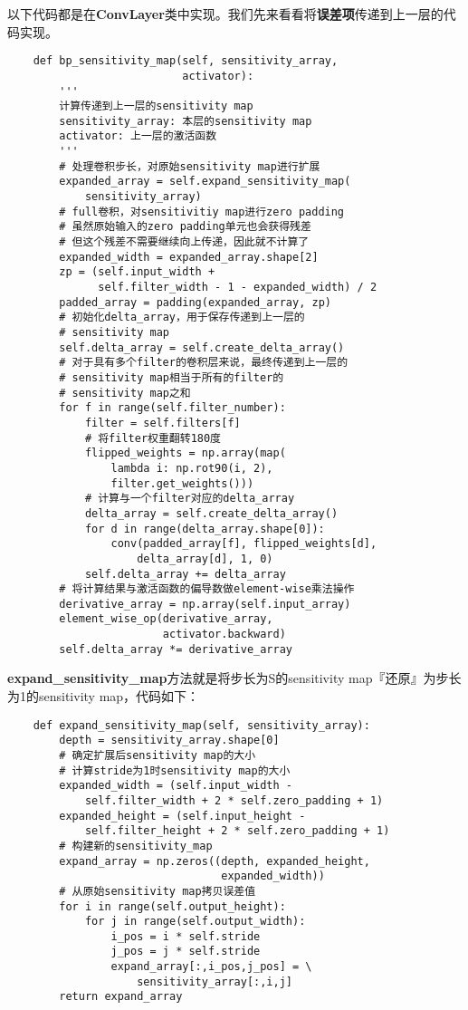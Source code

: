 以下代码都是在\textbf{ConvLayer}类中实现。我们先来看看将\textbf{误差项}传递到上一层的代码实现。
\begin{lstlisting}
    def bp_sensitivity_map(self, sensitivity_array,
                           activator):
        '''
        计算传递到上一层的sensitivity map
        sensitivity_array: 本层的sensitivity map
        activator: 上一层的激活函数
        '''
        # 处理卷积步长，对原始sensitivity map进行扩展
        expanded_array = self.expand_sensitivity_map(
            sensitivity_array)
        # full卷积，对sensitivitiy map进行zero padding
        # 虽然原始输入的zero padding单元也会获得残差
        # 但这个残差不需要继续向上传递，因此就不计算了
        expanded_width = expanded_array.shape[2]
        zp = (self.input_width +  
              self.filter_width - 1 - expanded_width) / 2
        padded_array = padding(expanded_array, zp)
        # 初始化delta_array，用于保存传递到上一层的
        # sensitivity map
        self.delta_array = self.create_delta_array()
        # 对于具有多个filter的卷积层来说，最终传递到上一层的
        # sensitivity map相当于所有的filter的
        # sensitivity map之和
        for f in range(self.filter_number):
            filter = self.filters[f]
            # 将filter权重翻转180度
            flipped_weights = np.array(map(
                lambda i: np.rot90(i, 2), 
                filter.get_weights()))
            # 计算与一个filter对应的delta_array
            delta_array = self.create_delta_array()
            for d in range(delta_array.shape[0]):
                conv(padded_array[f], flipped_weights[d],
                    delta_array[d], 1, 0)
            self.delta_array += delta_array
        # 将计算结果与激活函数的偏导数做element-wise乘法操作
        derivative_array = np.array(self.input_array)
        element_wise_op(derivative_array, 
                        activator.backward)
        self.delta_array *= derivative_array
\end{lstlisting}

\textbf{expand\_sensitivity\_map}方法就是将步长为S的sensitivity
map『还原』为步长为1的sensitivity map，代码如下：
\begin{lstlisting}
    def expand_sensitivity_map(self, sensitivity_array):
        depth = sensitivity_array.shape[0]
        # 确定扩展后sensitivity map的大小
        # 计算stride为1时sensitivity map的大小
        expanded_width = (self.input_width - 
            self.filter_width + 2 * self.zero_padding + 1)
        expanded_height = (self.input_height - 
            self.filter_height + 2 * self.zero_padding + 1)
        # 构建新的sensitivity_map
        expand_array = np.zeros((depth, expanded_height, 
                                 expanded_width))
        # 从原始sensitivity map拷贝误差值
        for i in range(self.output_height):
            for j in range(self.output_width):
                i_pos = i * self.stride
                j_pos = j * self.stride
                expand_array[:,i_pos,j_pos] = \
                    sensitivity_array[:,i,j]
        return expand_array
\end{lstlisting}

